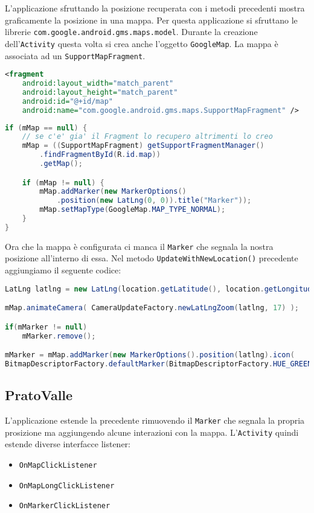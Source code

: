 L'applicazione sfruttando la posizione recuperata con i metodi precedenti mostra graficamente la posizione in una mappa.
Per questa applicazione si sfruttano le librerie \lstinline|com.google.android.gms.maps.model|. Durante la creazione dell'\lstinline|Activity| questa volta si crea anche l'oggetto \lstinline|GoogleMap|. La mappa è associata ad un \lstinline|SupportMapFragment|.
\begin{lstlisting}[language=XML]
<fragment
	android:layout_width="match_parent"
	android:layout_height="match_parent" 
	android:id="@+id/map" 
	android:name="com.google.android.gms.maps.SupportMapFragment" />
\end{lstlisting}

\begin{lstlisting}[language=Java]
if (mMap == null) {
	// se c'e' gia' il Fragment lo recupero altrimenti lo creo
	mMap = ((SupportMapFragment) getSupportFragmentManager()
		.findFragmentById(R.id.map))
		.getMap();

	if (mMap != null) {
		mMap.addMarker(new MarkerOptions()
			.position(new LatLng(0, 0)).title("Marker"));
		mMap.setMapType(GoogleMap.MAP_TYPE_NORMAL);
	}
}
\end{lstlisting}

Ora che la mappa è configurata ci manca il \lstinline|Marker| che segnala la nostra posizione all'interno di essa. Nel metodo \lstinline|UpdateWithNewLocation()| precedente aggiungiamo il seguente codice:

\begin{lstlisting}[language=Java]
LatLng latlng = new LatLng(location.getLatitude(), location.getLongitude());

mMap.animateCamera( CameraUpdateFactory.newLatLngZoom(latlng, 17) );

if(mMarker != null)
	mMarker.remove();

mMarker = mMap.addMarker(new MarkerOptions().position(latlng).icon(
BitmapDescriptorFactory.defaultMarker(BitmapDescriptorFactory.HUE_GREEN)).title("Here I Am"));
\end{lstlisting}


\subsection{PratoValle}

L'applicazione estende la precedente rimuovendo il \lstinline|Marker| che segnala la propria prosizione ma aggiungendo alcune interazioni con la mappa. L'\lstinline|Activity| quindi estende diverse interfacce listener: 
\begin{itemize}
	\item \lstinline|OnMapClickListener|
	\item \lstinline|OnMapLongClickListener| 
	\item \lstinline|OnMarkerClickListener|
\end{itemize}


